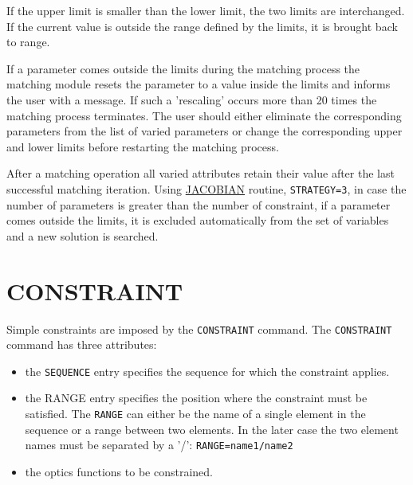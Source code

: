 If the upper limit is smaller than the lower limit, the two limits are
interchanged. If the current value is outside the range defined by the
limits, it is brought back to range. 

If a parameter comes outside the
limits during the matching process the matching module resets the
parameter to a value inside the limits and informs the user with a
message. If such a 'rescaling' occurs more than 20 times the matching
process terminates. The user should either eliminate the corresponding
parameters from the list of varied parameters or change the
corresponding upper and lower limits before restarting the matching
process. 

After a matching operation all varied attributes retain their
value after the last successful matching iteration. Using
\hyperref[subsec:match-jacobian]{JACOBIAN} routine, \texttt{STRATEGY=3}, in case
the number of parameters is greater than the number of constraint, if a
parameter comes outside the limits, it is excluded automatically from
the set of variables and a new solution is searched.  




%

\section{CONSTRAINT}
\label{sec:constraint}

Simple constraints are imposed by the \texttt{CONSTRAINT} command. 
The \texttt{CONSTRAINT} command has three attributes:   
\begin{itemize}
 \item  the \texttt{SEQUENCE} entry specifies the sequence for which the
   constraint applies.  
 \item  the RANGE entry specifies the position where the
   constraint must be satisfied. The \texttt{RANGE} can either be the name
   of a single element in the sequence or a range between two
   elements. In the later case the two element names must be
   separated by a '/': \texttt{RANGE=name1/name2}  
 \item the optics functions to be constrained. 
\end{itemize} 

